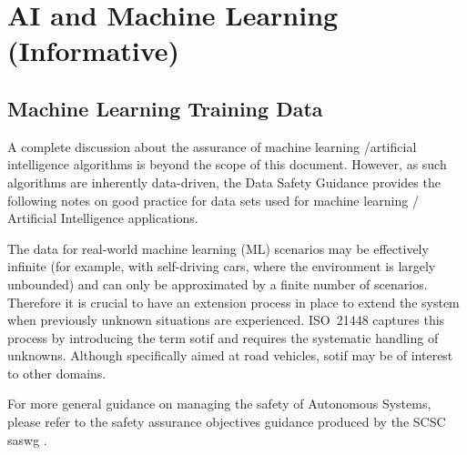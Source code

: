 %
%
\section{AI and Machine Learning (Informative)} \label{bkm:MachineLearning}



\subsection{Machine Learning Training Data}
A complete discussion about the assurance of machine learning /artificial intelligence algorithms is beyond the scope of this document.
However, as such algorithms are inherently data-driven, the Data Safety Guidance provides the following notes on good practice for data sets used for machine learning / Artificial Intelligence applications.

The data for real-world machine learning
\cbstart
(ML)
scenarios may be effectively infinite (for example, with self-driving cars, where the environment is largely unbounded) and can only be approximated by a finite number of scenarios.
\cbend
Therefore it is crucial to have an extension process in place to extend the system when previously unknown situations are experienced. 
ISO~21448 \cite{citation:ISO21448} captures this process by introducing the term \gls{sotif} and requires the systematic handling of unknowns. Although specifically aimed at road vehicles, \gls{sotif} may be of interest to other domains.

For more general guidance on managing the safety of Autonomous Systems, please refer to the safety assurance objectives guidance produced by the SCSC \gls{saswg} \cite{citation:SASWG:Objectives}.

